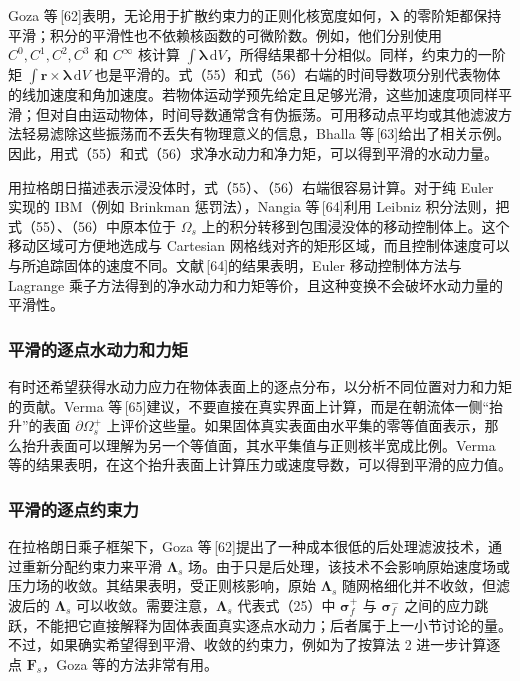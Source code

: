 \documentclass[UTF8,11pt,a4paper]{ctexart}
\newcommand{\dd}{\,\mathrm{d}}
\begin{document}
Goza 等\,[62]表明，无论用于扩散约束力的正则化核宽度如何，$\bm\lambda$ 的零阶矩都保持平滑；积分的平滑性也不依赖核函数的可微阶数。例如，他们分别使用 $C^0,C^1,C^2,C^3$ 和 $C^{\infty}$ 核计算 $\int\bm\lambda\dd V$，所得结果都十分相似。同样，约束力的一阶矩 $\int\bm r\times\bm\lambda\dd V$ 也是平滑的。式（55）和式（56）右端的时间导数项分别代表物体的线加速度和角加速度。若物体运动学预先给定且足够光滑，这些加速度项同样平滑；但对自由运动物体，时间导数通常含有伪振荡。可用移动点平均或其他滤波方法轻易滤除这些振荡而不丢失有物理意义的信息，Bhalla 等\,[63]给出了相关示例。因此，用式（55）和式（56）求净水动力和净力矩，可以得到平滑的水动力量。

用拉格朗日描述表示浸没体时，式（55）、（56）右端很容易计算。对于纯 Euler 实现的 IBM（例如 Brinkman 惩罚法），Nangia 等\,[64]利用 Leibniz 积分法则，把式（55）、（56）中原本位于 $\Omega_s$ 上的积分转移到包围浸没体的移动控制体上。这个移动区域可方便地选成与 Cartesian 网格线对齐的矩形区域，而且控制体速度可以与所追踪固体的速度不同。文献\,[64]的结果表明，Euler 移动控制体方法与 Lagrange 乘子方法得到的净水动力和力矩等价，且这种变换不会破坏水动力量的平滑性。

\subsubsection{平滑的逐点水动力和力矩}

有时还希望获得水动力应力在物体表面上的逐点分布，以分析不同位置对力和力矩的贡献。Verma 等\,[65]建议，不要直接在真实界面上计算，而是在朝流体一侧“抬升”的表面 $\partial\Omega_s^{+}$ 上评价这些量。如果固体真实表面由水平集的零等值面表示，那么抬升表面可以理解为另一个等值面，其水平集值与正则核半宽成比例。Verma 等的结果表明，在这个抬升表面上计算压力或速度导数，可以得到平滑的应力值。

\subsubsection{平滑的逐点约束力}

在拉格朗日乘子框架下，Goza 等\,[62]提出了一种成本很低的后处理滤波技术，通过重新分配约束力来平滑 $\bm\Lambda_s$ 场。由于只是后处理，该技术不会影响原始速度场或压力场的收敛。其结果表明，受正则核影响，原始 $\bm\Lambda_s$ 随网格细化并不收敛，但滤波后的 $\bm\Lambda_s$ 可以收敛。需要注意，$\bm\Lambda_s$ 代表式（25）中 $\bm\sigma_f^{+}$ 与 $\bm\sigma_f^{-}$ 之间的应力跳跃，不能把它直接解释为固体表面真实逐点水动力；后者属于上一小节讨论的量。不过，如果确实希望得到平滑、收敛的约束力，例如为了按算法 2 进一步计算逐点 $\bm F_s$，Goza 等的方法非常有用。
\end{document}
